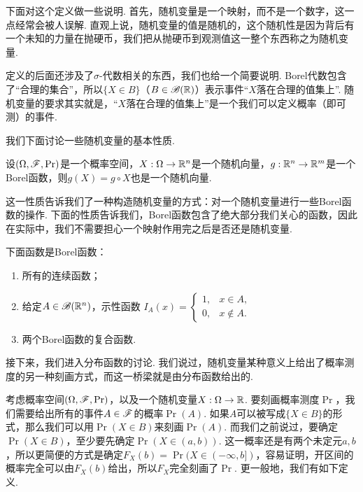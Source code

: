 下面对这个定义做一些说明. 首先，随机变量是一个映射，而不是一个数字，这一点经常会被人误解. 直观上说，随机变量的值是随机的，这个随机性是因为背后有一个未知的力量在抛硬币，我们把从抛硬币到观测值这一整个东西称之为随机变量. 

定义的后面还涉及了$\sigma$-代数相关的东西，我们也给一个简要说明. Borel代数包含了“合理的集合”，所以$\{X\in B\}$（$B\in\mathscr{B}(\mathbb{R})$）表示事件“$X$落在合理的值集上”. 随机变量的要求其实就是，“$X$落在合理的值集上”是一个我们可以定义概率（即可测）的事件. 

我们下面讨论一些随机变量的基本性质. 

\begin{proposition}\label{prop:random-variable}
设$(\Omega,\mathscr{F},\Pr)$是一个概率空间，$X:\Omega\to\mathbb{R}^n$是一个随机向量，$g:\mathbb{R}^n\to\mathbb{R}^m$是一个Borel函数，则$g(X)=g\circ X$也是一个随机向量. 
\end{proposition}

这一性质告诉我们了一种构造随机变量的方式：对一个随机变量进行一些Borel函数的操作. 下面的性质告诉我们，Borel函数包含了绝大部分我们关心的函数，因此在实际中，我们不需要担心一个映射作用完之后是否还是随机变量.

\begin{proposition}\label{prop:borel-function}
下面函数是Borel函数：
\begin{enumerate}
    \item 所有的连续函数；
    \item 给定$A\in\mathscr{B}(\mathbb{R}^n)$，示性函数
    $I_A(x) = \begin{cases}
        1, & x\in A,\\
        0, & x\notin A.
    \end{cases}$
    \item 两个Borel函数的复合函数. 
\end{enumerate}
\end{proposition}



接下来，我们进入分布函数的讨论. 我们说过，随机变量某种意义上给出了概率测度的另一种刻画方式，而这一桥梁就是由分布函数给出的. 

考虑概率空间$(\Omega,\mathscr{F},\Pr)$，以及一个随机变量$X:\Omega\to\mathbb{R}$. 要刻画概率测度$\Pr$，我们需要给出所有的事件$A\in\mathscr{F}$的概率$\Pr(A)$. 如果$A$可以被写成$\{X\in B\}$的形式，那么我们可以用$\Pr(X\in B)$来刻画$\Pr(A)$. 而我们之前说过，要确定$\Pr(X\in B)$，至少要先确定$\Pr(X\in(a,b))$. 这一概率还是有两个未定元$a,b$，所以更简便的方式是确定$F_X(b)=\Pr(X\in(-\infty,b])$，容易证明，开区间的概率完全可以由$F_X(b)$给出，所以$F_X$完全刻画了$\Pr$. 更一般地，我们有如下定义. 

